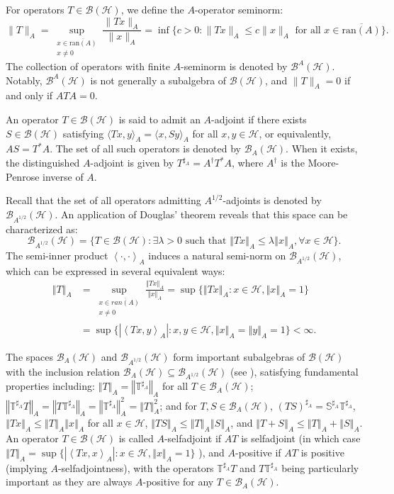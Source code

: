 \documentclass{article}
\newcommand{\seqA}[1]{{\left<#1\right>}_{A}}
\newcommand{\normA}[1]{{\left\Vert#1\right\Vert}_{A}}
\newcommand{\abs}[1]{\left\vert#1\right\vert}
\newcommand {\bh}{\mathcal{B}(\mathcal{H})}
\newcommand {\h}{\mathcal{H}}
\newcommand {\Ta}{\mathbb{T}^{\sharp_{A}}}
\newcommand {\Sa}{\mathbb{S}^{\sharp_{A}}}
\renewcommand {\b}{\mathcal{B}}
\begin{document}
For operators $T \in \mathcal{B}(\mathcal{H})$, we define the $A$-operator seminorm:
\[
\|T\|_A = \sup_{\substack{x \in \overline{\mathrm{ran}(A)} \\ x \neq 0}} \frac{\|Tx\|_A}{\|x\|_A} = \inf \{c > 0 : \|Tx\|_A \leq c\|x\|_A \text{ for all } x \in \overline{\mathrm{ran}(A)}\}.
\]
The collection of operators with finite $A$-seminorm is denoted by $\mathcal{B}^A(\mathcal{H})$. Notably, $\mathcal{B}^A(\mathcal{H})$ is not generally a subalgebra of $\mathcal{B}(\mathcal{H})$, and $\|T\|_A = 0$ if and only if $ATA = 0$.

An operator $T \in \mathcal{B}(\mathcal{H})$ is said to admit an $A$-adjoint if there exists $S \in \mathcal{B}(\mathcal{H})$ satisfying $\langle Tx,y \rangle_A = \langle x,Sy \rangle_A$ for all $x,y \in \mathcal{H}$, or equivalently, $AS = T^*A$. The set of all such operators is denoted by $\mathcal{B}_A(\mathcal{H})$. When it exists, the distinguished $A$-adjoint is given by $T^{\sharp_A} = A^\dagger T^* A$, where $A^\dagger$ is the Moore-Penrose inverse of $A$.

Recall that the set of all operators admitting $A^{1/2}$-adjoints is denoted by $\b_{A^{1/2}}(\h)$.
An application of Douglas' theorem reveals that this space can be characterized as:
\[
\b_{A^{1/2}}(\h) = \{T \in \bh : \exists \lambda > 0 \text{ such that } \normA{Tx} \leq \lambda\normA{x}, \forall x \in \h\}.
\]
The semi-inner product $\seqA{\cdot,\cdot}$ induces a natural semi-norm on $\b_{A^{1/2}}(\h)$, which can be expressed in several equivalent ways:
\begin{align*}
\normA{T} &= \sup_{\substack{x\in \overline{ran(A)}\\x\neq 0}}\frac{\normA{Tx}}{\normA{x}}
          = \sup\{\normA{Tx} : x \in \h, \normA{x} = 1\} \\
          &= \sup\{\abs{\seqA{Tx,y}} : x, y \in \h, \normA{x} = \normA{y} = 1\} < \infty.
\end{align*}

The spaces $\b_A(\h)$ and $\b_{A^{1/2}}(\h)$ form important subalgebras of $\bh$ with the inclusion relation $\b_A(\h) \subseteq \b_{A^{1/2}}(\h)$ (see \cite{ACG1, ACG2}), satisfying fundamental properties including: $\normA{T} = \normA{\Ta}$ for all $T \in \b_A(\h)$; $\normA{\Ta T} = \normA{T\Ta} = \normA{\Ta}^2 = \normA{T}^2$; and for $T, S \in \b_A(\h)$, $(TS)^{\sharp_A} = \Sa \Ta$, $\normA{Tx} \leq \normA{T}\normA{x}$ for all $x \in \h$, $\normA{TS} \leq \normA{T}\normA{S}$, and $\normA{T + S} \leq \normA{T} + \normA{S}$. An operator $T \in \bh$ is called $A$-selfadjoint if $AT$ is selfadjoint (in which case $\normA{T} = \sup\{\abs{\seqA{Tx,x}} : x \in \h, \normA{x} = 1\}$ \cite{Feki}), and $A$-positive if $AT$ is positive (implying $A$-selfadjointness), with the operators $\Ta T$ and $T\Ta$ being particularly important as they are always $A$-positive for any $T \in \b_A(\h)$.
\end{document}

